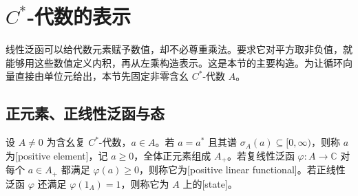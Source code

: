 

\section{\texorpdfstring{\(C^*\)}{C*}-代数的表示}
\label{b2:sec:D03}

线性泛函可以给代数元素赋予数值，却不必尊重乘法。要求它对平方取非负值，就能够用这些数值定义内积，再从左乘构造表示。这是本节的主要构造。为让循环向量直接由单位元给出，本节先固定非零含幺 \(C^*\)-代数 \(A\)。

\subsection{正元素、正线性泛函与态}
\label{b2:subsec:D03:01}

\begin{definition}\label{b2:def:positive-element-state}
	设 \(A\ne0\) 为含幺复 \(C^*\)-代数，\(a\in A\)。若 \(a=a^*\) 且其谱 \(\sigma_A(a)\subseteq[0,\infty)\)，则称 \(a\) 为[positive element]，记 \(a\geq0\)，全体正元素组成 \(A_+\)。若复线性泛函 \(\varphi:A\to\mathbb C\) 对每个 \(a\in A_+\) 都满足 \(\varphi(a)\geq0\)，则称它为[positive linear functional]。若正线性泛函 \(\varphi\) 还满足 \(\varphi(1_A)=1\)，则称它为 \(A\) 上的[state]。
\end{definition}

